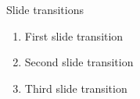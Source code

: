 \begin{frame}{Slide transitions}
  \begin{enumerate}
    \item<1,2> First slide transition
    \item<2> Second slide transition
    \item<3> Third slide transition
  \end{enumerate}
\end{frame}



